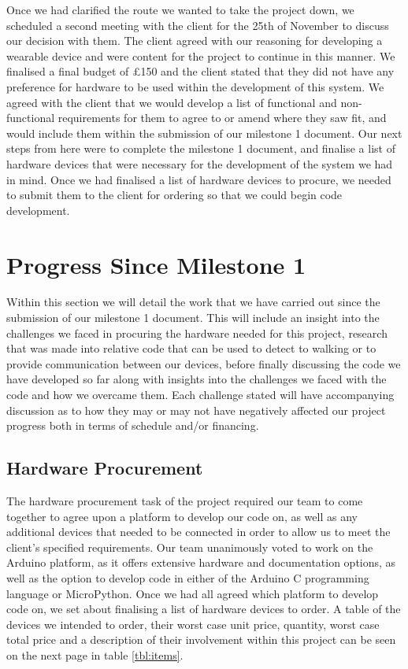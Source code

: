 Once we had clarified the route we wanted to take the project down, we scheduled a second meeting with the client for the 25th of November to discuss our decision with them. The client agreed with our reasoning for developing a wearable device and were content for the project to continue in this manner. We finalised a final budget of £150 and the client stated that they did not have any preference for hardware to be used within the development of this system. We agreed with the client that we would develop a list of functional and non-functional requirements for them to agree to or amend where they saw fit, and would include them within the submission of our milestone 1 document. Our next steps from here were to complete the milestone 1 document, and finalise a list of hardware devices that were necessary for the development of the system we had in mind. Once we had finalised a list of hardware devices to procure, we needed to submit them to the client for ordering so that we could begin code development.

\section{Progress Since Milestone 1}

Within this section we will detail the work that we have carried out since the submission of our milestone 1 document. This will include an insight into the challenges we faced in procuring the hardware needed for this project, research that was made into relative code that can be used to detect to walking or to provide communication between our devices, before finally discussing the code we have developed so far along with insights into the challenges we faced with the code and how we overcame them. Each challenge stated will have accompanying discussion as to how they may or may not have negatively affected our project progress both in terms of schedule and/or financing.

\subsection{Hardware Procurement}

The hardware procurement task of the project required our team to come together to agree upon a platform to develop our code on, as well as any additional devices that needed to be connected in order to allow us to meet the client's specified requirements. Our team unanimously voted to work on the Arduino platform, as it offers extensive hardware and documentation options, as well as the option to develop code in either of the Arduino C programming language or MicroPython. Once we had all agreed which platform to develop code on, we set about finalising a list of hardware devices to order. A table of the devices we intended to order, their worst case unit price, quantity, worst case total price and a description of their involvement within this project can be seen on the next page in table \ref{tbl:items}.

